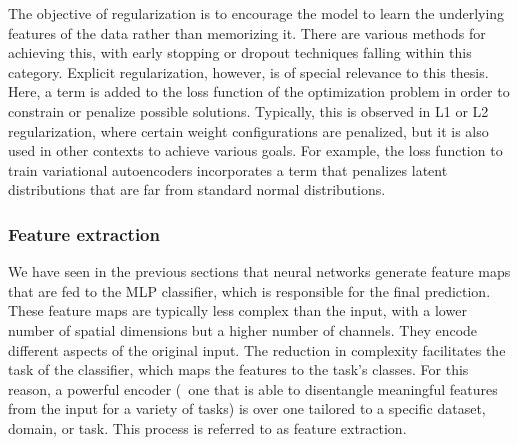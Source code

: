 The objective of regularization is to encourage the model to learn the underlying features of the data rather than memorizing it. There are various methods for achieving this, with early stopping or dropout techniques falling within this category. Explicit regularization, however, is of special relevance to this thesis. Here, a term is added to the loss function of the optimization problem in order to constrain or penalize possible solutions. Typically, this is observed in L1 or L2 regularization, where certain weight configurations are penalized, but it is also used in other contexts to achieve various goals. For example, the loss function to train variational autoencoders incorporates a term that penalizes latent distributions that are far from standard normal distributions.

\subsubsection{Feature extraction}

We have seen in the previous sections that neural networks generate feature maps that are fed to the MLP classifier, which is responsible for the final prediction. These feature maps are typically less complex than the input, with a lower number of spatial dimensions but a higher number of channels. They encode different aspects of the original input. The reduction in complexity facilitates the task of the classifier, which maps the features to the task's classes. For this reason, a powerful encoder (\ie~one that is able to disentangle meaningful features from the input for a variety of tasks) is  over one tailored to a specific dataset, domain, or task. This process is referred to as feature extraction.

